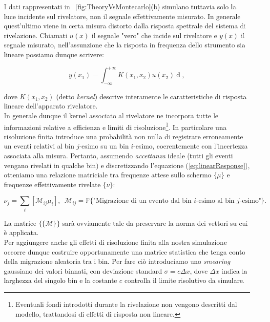 \noindent I dati rappresentati in \figurename~\ref{fig:TheoryVsMontecarlo}(b) simulano tuttavia solo la luce incidente sul rivelatore, non il segnale effettivamente misurato. In generale quest'ultimo viene in certa misura distorto dalla risposta spettrale del sistema di rivelazione. Chiamati $u(x)$ il segnale "vero" che incide sul rivelatore e $y(x)$ il segnale misurato, nell'assunzione che la risposta in frequenza dello strumento sia lineare possiamo dunque scrivere:

\begin{equation}
y(x_1) = \int_{-\infty}^{+\infty} K(x_1,x_2)u(x_2)\mathop{dx_2},
\label{eq:linearResponse}
\end{equation}

\noindent dove $K(x_1,x_2)$ (detto \emph{kernel}) descrive interamente le caratteristiche di risposta lineare dell'apparato rivelatore.\\

\noindent In generale dunque il kernel associato al rivelatore ne incorpora tutte le informazioni relative a efficienza e limiti di risoluzione\footnote{Eventuali fondi introdotti durante la rivelazione non vengono descritti dal modello, trattandosi di effetti di risposta non lineare.}. In particolare una risoluzione finita introduce una probabilità non nulla di registrare erroneamente un eventi relativi al  bin $j$-esimo su un bin $i$-esimo, coerentemente con  l'incertezza associata alla misura. Pertanto, assumendo \emph{accettanza} ideale (tutti gli eventi vengano rivelati in qualche bin) e discretizzando l'equazione (\ref{eq:linearResponse}), otteniamo una relazione matriciale tra frequenze attese sullo schermo $\{\mu\}$ e frequenze effettivamente rivelate $\{\nu\}$:
 
\begin{equation}
\nu_j = \sum_{i} \left[\mathcal{M}_{ij} \mu_i\right],\enspace\mathcal{M}_{ij} = \mathbb{P}\{\text{"Migrazione di un evento dal bin $i$-esimo al bin $j$-esimo"}\}.
\end{equation}

\noindent La matrice $\{\{\mathcal{M}\}\}$ sarà ovviamente tale da preservare la norma dei vettori su cui è applicata.\\

\noindent Per aggiungere anche gli effetti di risoluzione finita alla nostra simulazione occorre dunque costruire opportunamente una matrice statistica che tenga conto della migrazione aleatoria tra i bin. Per fare ciò introduciamo uno \emph{smearing} gaussiano dei valori binnati, con deviazione standard $\sigma = c\Delta x$, dove $\Delta x$ indica la larghezza del singolo bin e la costante $c$ controlla il limite risolutivo da simulare.\\

